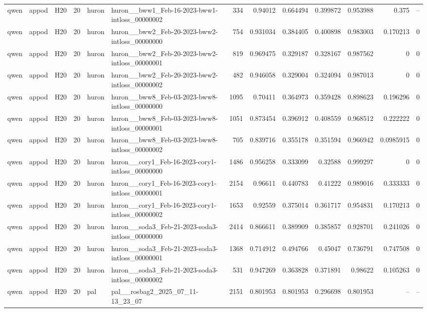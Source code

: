 \begin{longtable}{lllrllrrrrrrr}
qwen & appod & H20 & 20 & huron & huron\_\_bww1\_Feb-16-2023-bww1-intloss\_00000002 & 334 & 0.94012 & 0.664494 & 0.399872 & 0.953988 & 0.375 & -- \\
qwen & appod & H20 & 20 & huron & huron\_\_bww2\_Feb-20-2023-bww2-intloss\_00000000 & 754 & 0.931034 & 0.384405 & 0.400898 & 0.983003 & 0.170213 & 0 \\
qwen & appod & H20 & 20 & huron & huron\_\_bww2\_Feb-20-2023-bww2-intloss\_00000001 & 819 & 0.969475 & 0.329187 & 0.328167 & 0.987562 & 0 & 0 \\
qwen & appod & H20 & 20 & huron & huron\_\_bww2\_Feb-20-2023-bww2-intloss\_00000002 & 482 & 0.946058 & 0.329004 & 0.324094 & 0.987013 & 0 & 0 \\
qwen & appod & H20 & 20 & huron & huron\_\_bww8\_Feb-03-2023-bww8-intloss\_00000000 & 1095 & 0.70411 & 0.364973 & 0.359428 & 0.898623 & 0.196296 & 0 \\
qwen & appod & H20 & 20 & huron & huron\_\_bww8\_Feb-03-2023-bww8-intloss\_00000001 & 1051 & 0.873454 & 0.396912 & 0.408559 & 0.968512 & 0.222222 & 0 \\
qwen & appod & H20 & 20 & huron & huron\_\_bww8\_Feb-03-2023-bww8-intloss\_00000002 & 705 & 0.839716 & 0.355178 & 0.351594 & 0.966942 & 0.0985915 & 0 \\
qwen & appod & H20 & 20 & huron & huron\_\_cory1\_Feb-16-2023-cory1-intloss\_00000000 & 1486 & 0.956258 & 0.333099 & 0.32588 & 0.999297 & 0 & 0 \\
qwen & appod & H20 & 20 & huron & huron\_\_cory1\_Feb-16-2023-cory1-intloss\_00000001 & 2154 & 0.96611 & 0.440783 & 0.41222 & 0.989016 & 0.333333 & 0 \\
qwen & appod & H20 & 20 & huron & huron\_\_cory1\_Feb-16-2023-cory1-intloss\_00000002 & 1653 & 0.92559 & 0.375014 & 0.361717 & 0.954831 & 0.170213 & 0 \\
qwen & appod & H20 & 20 & huron & huron\_\_soda3\_Feb-21-2023-soda3-intloss\_00000000 & 2414 & 0.866611 & 0.389909 & 0.385857 & 0.928701 & 0.241026 & 0 \\
qwen & appod & H20 & 20 & huron & huron\_\_soda3\_Feb-21-2023-soda3-intloss\_00000001 & 1368 & 0.714912 & 0.494766 & 0.45047 & 0.736791 & 0.747508 & 0 \\
qwen & appod & H20 & 20 & huron & huron\_\_soda3\_Feb-21-2023-soda3-intloss\_00000002 & 531 & 0.947269 & 0.363828 & 0.371891 & 0.98622 & 0.105263 & 0 \\
qwen & appod & H20 & 20 & pal & pal\_\_rosbag2\_2025\_07\_11-13\_23\_07 & 2151 & 0.801953 & 0.801953 & 0.296698 & 0.801953 & -- & -- \\

\end{longtable}
